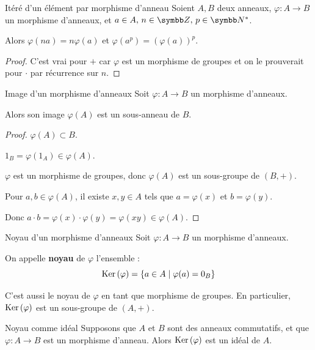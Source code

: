 \begin{proposition}{Itéré d'un élément par morphisme d'anneau}{}
    Soient $A, B$ deux anneaux, $\varphi : A \to B$ un morphisme d'anneaux, 
    et ${a \in A}, \, {n \in \Z}, \, {p \in \N^*}$. 

    Alors $\varphi(na) = n \varphi(a)$ et $\varphi(a^p) = (\varphi(a))^p$.
\end{proposition}

\begin{proof}
    C'est vrai pour $+$ car $\varphi$ est un morphisme de groupes et on le prouverait pour $\cdot$ par récurrence sur $n$.
\end{proof}

\begin{proposition}{Image d'un morphisme d'anneaux}{}
    Soit $\varphi : A \to B$ un morphisme d'anneaux. 

    Alors son image $\varphi(A)$ est un sous-anneau de $B$.
\end{proposition}

\begin{proof}
    $\varphi(A) \subset B$.

    $1_B = \varphi(1_A) \in \varphi(A)$.

    $\varphi$ est un morphisme de groupes, donc $\varphi(A)$ est un sous-groupe de $(B, +)$.

    Pour $a, b \in \varphi(A)$, il existe $x, y \in A$ tels que $a = \varphi(x)$ et $b = \varphi(y)$.

    Donc $a \cdot b = \varphi(x) \cdot \varphi(y) = \varphi(xy) \in \varphi(A)$.
\end{proof}

\begin{definition}{Noyau d'un morphisme d'anneaux}{}
    Soit $\varphi : A \to B$ un morphisme d'anneaux. 

    On appelle \textbf{noyau} de $\varphi$ l'ensemble :
    \[\operatorname{Ker} \,(\varphi) = \{a \in A \mid \varphi(a) = 0_B\}\]

    C'est aussi le noyau de $\varphi$ en tant que morphisme de groupes. En particulier, 
    $\operatorname{Ker} \,(\varphi)$ est un sous-groupe de $(A, +)$.
\end{definition}

\begin{proposition}{Noyau comme idéal}{}
    Supposons que $A$ et $B$ sont des anneaux commutatifs, et que $\varphi: A \to B$ est un morphisme d'anneau. 
    Alors $\operatorname{Ker} \,(\varphi)$ est un idéal de $A$.
\end{proposition}

